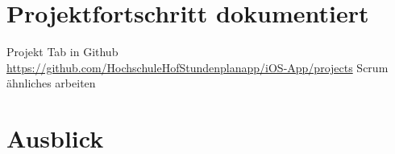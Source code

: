 \section{Projektfortschritt dokumentiert}
Projekt Tab in Github\\
\url{https://github.com/HochschuleHofStundenplanapp/iOS-App/projects}
Scrum ähnliches arbeiten




\section{Ausblick}

